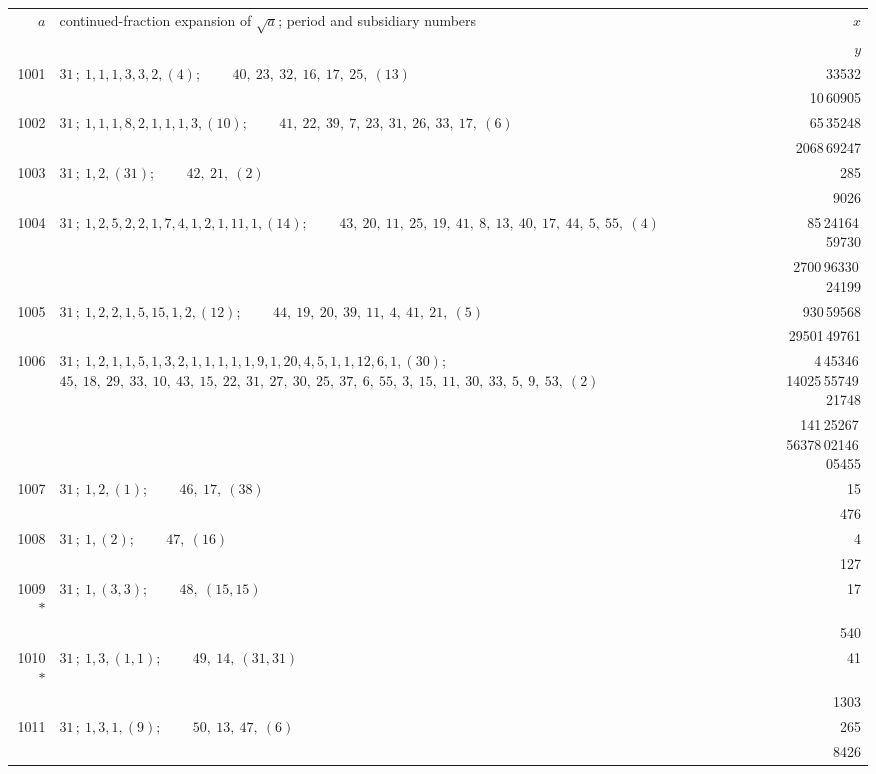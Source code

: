 \documentclass[11pt]{article}
\providecommand{\asterism}{*}
\begin{document}
\medskip
\renewcommand{\arraystretch}{1.15}
\begin{longtable}{|r|p{}|r|}
\hline
$a$ & continued-fraction expansion of $\sqrt{a}$; period and subsidiary numbers & $x$ \\
 & & $y$ \\
\hline
\endhead
1001 & $31\,;\ 1, 1, 1, 3, 3, 2, (4)$; \ \ \ \ $40,\ 23,\ 32,\ 16,\ 17,\ 25,\ (13)$ & 33532 \\
 & & 10\,60905 \\
\hline
1002 & $31\,;\ 1, 1, 1, 8, 2, 1, 1, 1, 3, (10)$; \ \ \ \ $41,\ 22,\ 39,\ 7,\ 23,\ 31,\ 26,\ 33,\ 17,\ (6)$ & 65\,35248 \\
 & & 2068\,69247 \\
\hline
1003 & $31\,;\ 1, 2, (31)$; \ \ \ \ $42,\ 21,\ (2)$ & 285 \\
 & & 9026 \\
\hline
1004 & $31\,;\ 1, 2, 5, 2, 2, 1, 7, 4, 1, 2, 1, 11, 1, (14)$; \ \ \ \ $43,\ 20,\ 11,\ 25,\ 19,\ 41,\ 8,\ 13,\ 40,\ 17,\ 44,\ 5,\ 55,\ (4)$ & 85\,24164\,59730 \\
 & & 2700\,96330\,24199 \\
\hline
1005 & $31\,;\ 1, 2, 2, 1, 5, 15, 1, 2, (12)$; \ \ \ \ $44,\ 19,\ 20,\ 39,\ 11,\ 4,\ 41,\ 21,\ (5)$ & 930\,59568 \\
 & & 29501\,49761 \\
\hline
1006 & $31\,;\ 1, 2, 1, 1, 5, 1, 3, 2, 1, 1, 1, 1, 1, 9, 1, 20, 4, 5, 1, 1, 12, 6, 1, (30)$; \ \ \ \ $45,\ 18,\ 29,\ 33,\ 10,\ 43,\ 15,\ 22,\ 31,\ 27,\ 30,\ 25,\ 37,\ 6,\ 55,\ 3,\ 15,\ 11,\ 30,\ 33,\ 5,\ 9,\ 53,\ (2)$ & 4\,45346\,14025\,55749\,21748 \\
 & & 141\,25267\,56378\,02146\,05455 \\
\hline
1007 & $31\,;\ 1, 2, (1)$; \ \ \ \ $46,\ 17,\ (38)$ & 15 \\
 & & 476 \\
\hline
1008 & $31\,;\ 1, (2)$; \ \ \ \ $47,\ (16)$ & 4 \\
 & & 127 \\
\hline
1009$\asterism$ & $31\,;\ 1, (3, 3)$; \ \ \ \ $48,\ (15, 15)$ & 17 \\
 & & 540 \\
\hline
1010$\asterism$ & $31\,;\ 1, 3, (1, 1)$; \ \ \ \ $49,\ 14,\ (31, 31)$ & 41 \\
 & & 1303 \\
\hline
1011 & $31\,;\ 1, 3, 1, (9)$; \ \ \ \ $50,\ 13,\ 47,\ (6)$ & 265 \\
 & & 8426 \\

\end{longtable}
\end{document}
